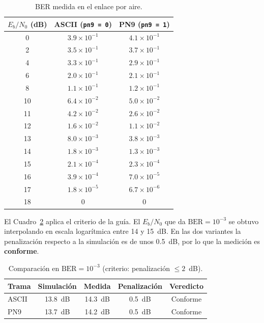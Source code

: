 \documentclass[conference]{IEEEtran}
\begin{document}
\begin{table}[!t]
\centering
\caption{BER medida en el enlace por aire.}
\label{tab:ber}
\begin{tabular}{ccc}
\toprule
$E_b/N_0$ (dB) & ASCII (\texttt{pn9 = 0}) & PN9 (\texttt{pn9 = 1}) \\
\midrule
0 & $3.9\times10^{-1}$ & $4.1\times10^{-1}$ \\
2 & $3.5\times10^{-1}$ & $3.7\times10^{-1}$ \\
4 & $3.3\times10^{-1}$ & $2.9\times10^{-1}$ \\
6 & $2.0\times10^{-1}$ & $2.1\times10^{-1}$ \\
8 & $1.1\times10^{-1}$ & $1.2\times10^{-1}$ \\
10 & $6.4\times10^{-2}$ & $5.0\times10^{-2}$ \\
11 & $4.2\times10^{-2}$ & $2.6\times10^{-2}$ \\
12 & $1.6\times10^{-2}$ & $1.1\times10^{-2}$ \\
13 & $8.0\times10^{-3}$ & $3.8\times10^{-3}$ \\
14 & $1.8\times10^{-3}$ & $1.3\times10^{-3}$ \\
15 & $2.1\times10^{-4}$ & $2.3\times10^{-4}$ \\
16 & $3.9\times10^{-4}$ & $7.0\times10^{-5}$ \\
17 & $1.8\times10^{-5}$ & $6.7\times10^{-6}$ \\
18 & 0 & 0 \\
\bottomrule
\end{tabular}
\end{table}

El Cuadro~\ref{tab:conf} aplica el criterio de la guía. El $E_b/N_0$ que da $\text{BER} = 10^{-3}$ se obtuvo interpolando en escala logarítmica entre 14 y 15~dB. En las dos variantes la penalización respecto a la simulación es de unos 0.5~dB, por lo que la medición es \textbf{conforme}.

\begin{table}[!t]
\centering
\caption{Comparación en $\text{BER} = 10^{-3}$ (criterio: penalización $\leq 2$~dB).}
\label{tab:conf}
\begin{tabular}{lcccc}
\toprule
Trama & Simulación & Medida & Penalización & Veredicto \\
\midrule
ASCII & 13.8~dB & 14.3~dB & 0.5~dB & Conforme \\
PN9 & 13.7~dB & 14.2~dB & 0.5~dB & Conforme \\
\bottomrule
\end{tabular}
\end{table}
\end{document}
